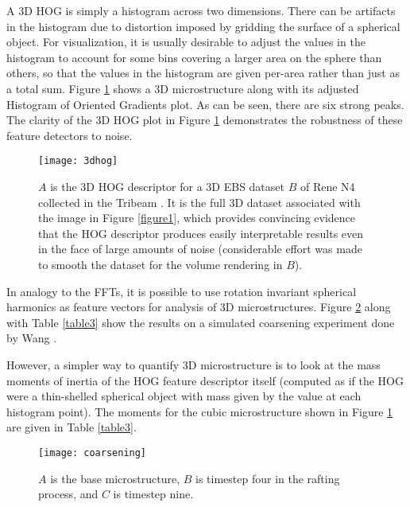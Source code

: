 \documentclass[review]{elsarticle}
\begin{document}
	A 3D HOG is simply a histogram across two dimensions. There can be artifacts in the histogram due to distortion imposed by gridding the surface of a spherical object. For visualization, it is usually desirable to adjust the values in the histogram to account for some bins covering a larger area on the sphere than others, so that the values in the histogram are given per-area rather than just as a total sum. Figure \ref{figure4} shows a 3D microstructure along with its adjusted Histogram of Oriented Gradients plot. As can be seen, there are six strong peaks. The clarity of the 3D HOG plot in Figure \ref{figure4} demonstrates the robustness of these feature detectors to noise.
	
	\begin{figure}[!ht]
  		\centering
    	\texttt{[image: 3dhog]}
  		\caption{ $A$ is the 3D HOG descriptor for a 3D EBS dataset $B$ of Rene N4 collected in the Tribeam \cite{tribeam}. It is the full 3D dataset associated with the image in Figure \ref{figure1}, which provides convincing evidence that the HOG descriptor produces easily interpretable results even in the face of large amounts of noise (considerable effort was made to smooth the dataset for the volume rendering in $B$). }
  		\label{figure4}
	\end{figure}

	In analogy to the FFTs, it is possible to use rotation invariant spherical harmonics \cite{spherical} as feature vectors for analysis of 3D microstructures. Figure \ref{figure8} along with Table \ref{table3} show the results on a simulated coarsening experiment done by Wang \cite{ywang2}.
	
	However, a simpler way to quantify 3D microstructure is to look at the mass moments of inertia of the HOG feature descriptor itself (computed as if the HOG were a thin-shelled spherical object with mass given by the value at each histogram point). The moments for the cubic microstructure shown in Figure \ref{figure4} are given in Table \ref{table3}.
	
	\begin{figure}[!ht]
  		\centering
    	\texttt{[image: coarsening]}
  		\caption{ $A$ is the base microstructure, $B$ is timestep four in the rafting process, and $C$ is timestep nine. }
  		\label{figure8}
	\end{figure}
	
\end{document}
